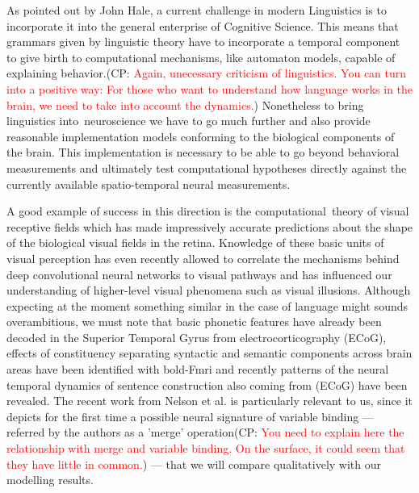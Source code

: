 \documentclass[10pt]{article}
\newcommand{\noteCP}[1]{(CP: \textcolor{red}{#1})}
\begin{document}
{\label{619233}}

As pointed out by John Hale\cite{hale2014automaton}, a current
challenge in modern Linguistics is to incorporate it into the general
enterprise of Cognitive Science. This means that grammars given by
linguistic theory have to incorporate a temporal component to give
birth to computational mechanisms, like automaton models, capable of
explaining behavior.\noteCP{Again, unecessary criticism of
  linguistics. You can turn into a positive way: For those who want to
  understand how language works in the brain, we need to take into
  account the dynamics.} Nonetheless to bring linguistics
into~neuroscience we have to go much further and also provide
reasonable implementation models conforming to the biological
components of the brain. This implementation is necessary to be able
to go beyond behavioral measurements and ultimately test computational
hypotheses directly against the currently available spatio-temporal
neural measurements.

A good example of success in this direction is the
computational~theory of visual receptive
fields\cite{lindeberg2017normative} which has made impressively accurate
predictions about the shape of the biological visual fields in the
retina. Knowledge of these basic units of visual perception has
even recently allowed to correlate the mechanisms behind deep
convolutional neural networks to visual
pathways\cite{Guclu_2015,Eickenberg_2017} and has influenced our
understanding of higher-level visual phenomena such as visual
illusions\cite{Eagleman_2001}. Although expecting at the moment
something similar in the case of language might sounds overambitious,
we must note that basic phonetic features have already been decoded in
the Superior Temporal Gyrus from electrocorticography
(ECoG)\cite{Mesgarani_2014}, effects of constituency separating
syntactic and semantic components across brain areas have been
identified with bold-Fmri\cite{Pallier_2011} and recently patterns of
the neural temporal dynamics of sentence construction also coming from
(ECoG) have been revealed\cite{Fedorenko_2016,Nelson_2017}. The recent
work from Nelson et al.\cite{Nelson_2017} is particularly relevant to
us, since it depicts for the first time a possible neural signature of
variable binding --- referred by the authors as a 'merge'
operation\noteCP{You need to explain here the relationship with merge
  and variable binding. On the surface, it could seem that they have
  little in common.} --- that we will compare qualitatively with our
modelling results.
\end{document}
